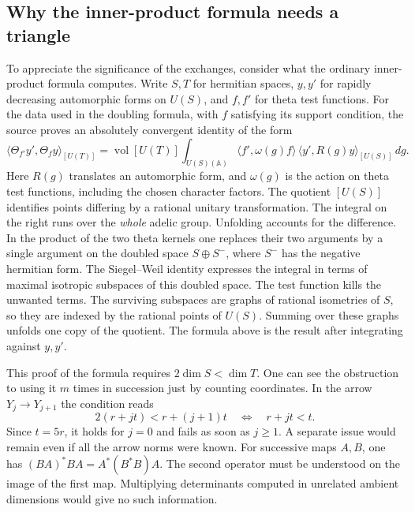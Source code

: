 \documentclass[11pt,letterpaper]{article}
\begin{document}
\subsection{Why the inner-product formula needs a triangle}
\label{sec:rallis-triangle}
To appreciate the significance of the exchanges, consider what the ordinary inner-product formula computes. Write $S,T$ for hermitian spaces, $y,y'$ for rapidly decreasing automorphic forms on $U(S)$, and $f,f'$ for theta test functions. For the data used in the doubling formula, with $f$ satisfying its support condition, the source proves an absolutely convergent identity of the form
\[
 \langle\Theta_{f'}y',\Theta_fy\rangle_{[U(T)]}
   =\operatorname{vol}[U(T)]
      \int_{U(S)(\mathbb A)}
        \langle f',\omega(g)f\rangle\,
        \langle y',R(g)y\rangle_{[U(S)]}\,dg .
\]
Here $R(g)$ translates an automorphic form, and $\omega(g)$ is the action on theta test functions, including the chosen character factors. The quotient $[U(S)]$ identifies points differing by a rational unitary transformation. The integral on the right runs over the \emph{whole} adelic group. Unfolding accounts for the difference. In the product of the two theta kernels one replaces their two arguments by a single argument on the doubled space $S\oplus S^{-}$, where $S^{-}$ has the negative hermitian form. The Siegel--Weil identity expresses the integral in terms of maximal isotropic subspaces of this doubled space. The test function kills the unwanted terms. The surviving subspaces are graphs of rational isometries of $S$, so they are indexed by the rational points of $U(S)$. Summing over these graphs unfolds one copy of the quotient. The formula above is the result after integrating against $y,y'$.

This proof of the formula requires $2\dim S<\dim T$. One can see the obstruction to using it $m$ times in succession just by counting coordinates. In the arrow $Y_j\to Y_{j+1}$ the condition reads
\[
                  2(r+jt)<r+(j+1)t
                      \quad\Longleftrightarrow\quad r+jt<t.
\]
Since $t=5r$, it holds for $j=0$ and fails as soon as $j\ge1$. A separate issue would remain even if all the arrow norms were known. For successive maps $A,B$, one has $(BA)^*BA=A^*(B^*B)A$. The second operator must be understood on the image of the first map. Multiplying determinants computed in unrelated ambient dimensions would give no such information.
\end{document}

